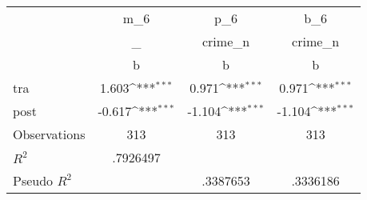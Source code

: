 {
\def\sym#1{\ifmmode^{#1}\else\(^{#1}\)\fi}
\begin{tabular}{l*{3}{c}}
\toprule
                    &         m\_6         &         p\_6         &         b\_6         \\
                    &           \_         &     crime\_n         &     crime\_n         \\
                    &           b         &           b         &           b         \\
\midrule
tra                 &       1.603\sym{***}&       0.971\sym{***}&       0.971\sym{***}\\
post                &      -0.617\sym{***}&      -1.104\sym{***}&      -1.104\sym{***}\\
\midrule
Observations        &         313         &         313         &         313         \\
\(R^{2}\)           &    .7926497         &                     &                     \\
Pseudo \(R^{2}\)    &                     &    .3387653         &    .3336186         \\
\bottomrule
\end{tabular}
}
